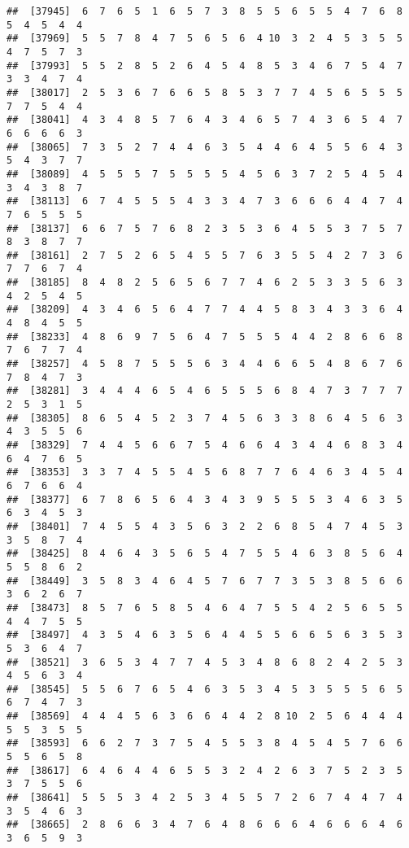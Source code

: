 \documentclass[
]{book}
\begin{document}
\begin{verbatim}
##  [37945]  6  7  6  5  1  6  5  7  3  8  5  5  6  5  5  4  7  6  8  5  4  5  4  4
##  [37969]  5  5  7  8  4  7  5  6  5  6  4 10  3  2  4  5  3  5  5  4  7  5  7  3
##  [37993]  5  5  2  8  5  2  6  4  5  4  8  5  3  4  6  7  5  4  7  3  3  4  7  4
##  [38017]  2  5  3  6  7  6  6  5  8  5  3  7  7  4  5  6  5  5  5  7  7  5  4  4
##  [38041]  4  3  4  8  5  7  6  4  3  4  6  5  7  4  3  6  5  4  7  6  6  6  6  3
##  [38065]  7  3  5  2  7  4  4  6  3  5  4  4  6  4  5  5  6  4  3  5  4  3  7  7
##  [38089]  4  5  5  5  7  5  5  5  5  4  5  6  3  7  2  5  4  5  4  3  4  3  8  7
##  [38113]  6  7  4  5  5  5  4  3  3  4  7  3  6  6  6  4  4  7  4  7  6  5  5  5
##  [38137]  6  6  7  5  7  6  8  2  3  5  3  6  4  5  5  3  7  5  7  8  3  8  7  7
##  [38161]  2  7  5  2  6  5  4  5  5  7  6  3  5  5  4  2  7  3  6  7  7  6  7  4
##  [38185]  8  4  8  2  5  6  5  6  7  7  4  6  2  5  3  3  5  6  3  4  2  5  4  5
##  [38209]  4  3  4  6  5  6  4  7  7  4  4  5  8  3  4  3  3  6  4  4  8  4  5  5
##  [38233]  4  8  6  9  7  5  6  4  7  5  5  5  4  4  2  8  6  6  8  7  6  7  7  4
##  [38257]  4  5  8  7  5  5  5  6  3  4  4  6  6  5  4  8  6  7  6  7  8  4  7  3
##  [38281]  3  4  4  4  6  5  4  6  5  5  5  6  8  4  7  3  7  7  7  2  5  3  1  5
##  [38305]  8  6  5  4  5  2  3  7  4  5  6  3  3  8  6  4  5  6  3  4  3  5  5  6
##  [38329]  7  4  4  5  6  6  7  5  4  6  6  4  3  4  4  6  8  3  4  6  4  7  6  5
##  [38353]  3  3  7  4  5  5  4  5  6  8  7  7  6  4  6  3  4  5  4  6  7  6  6  4
##  [38377]  6  7  8  6  5  6  4  3  4  3  9  5  5  5  3  4  6  3  5  6  3  4  5  3
##  [38401]  7  4  5  5  4  3  5  6  3  2  2  6  8  5  4  7  4  5  3  3  5  8  7  4
##  [38425]  8  4  6  4  3  5  6  5  4  7  5  5  4  6  3  8  5  6  4  5  5  8  6  2
##  [38449]  3  5  8  3  4  6  4  5  7  6  7  7  3  5  3  8  5  6  6  3  6  2  6  7
##  [38473]  8  5  7  6  5  8  5  4  6  4  7  5  5  4  2  5  6  5  5  4  4  7  5  5
##  [38497]  4  3  5  4  6  3  5  6  4  4  5  5  6  6  5  6  3  5  3  5  3  6  4  7
##  [38521]  3  6  5  3  4  7  7  4  5  3  4  8  6  8  2  4  2  5  3  4  5  6  3  4
##  [38545]  5  5  6  7  6  5  4  6  3  5  3  4  5  3  5  5  5  6  5  6  7  4  7  3
##  [38569]  4  4  4  5  6  3  6  6  4  4  2  8 10  2  5  6  4  4  4  5  5  3  5  5
##  [38593]  6  6  2  7  3  7  5  4  5  5  3  8  4  5  4  5  7  6  6  5  5  6  5  8
##  [38617]  6  4  6  4  4  6  5  5  3  2  4  2  6  3  7  5  2  3  5  3  7  5  5  6
##  [38641]  5  5  5  3  4  2  5  3  4  5  5  7  2  6  7  4  4  7  4  3  5  4  6  3
##  [38665]  2  8  6  6  3  4  7  6  4  8  6  6  6  4  6  6  6  4  6  3  6  5  9  3

\end{verbatim}
\end{document}
